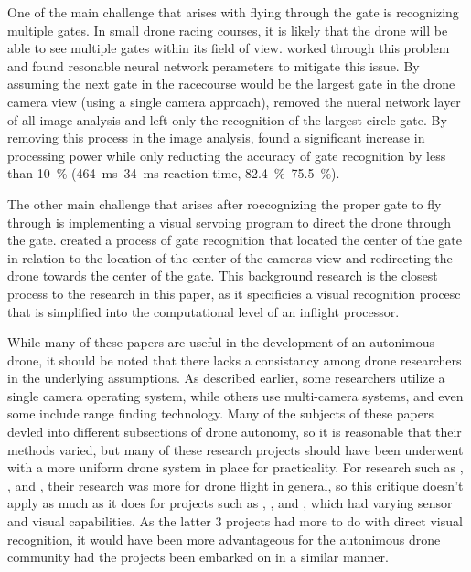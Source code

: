 \documentclass[onecolumn,10pt]{IEEEtran}
\begin{document}
One of the main challenge that arises with flying through the gate is recognizing multiple gates. In small drone racing courses, it is likely that the drone will be able to see multiple gates within its field of view. \cite{jung2018perception} worked through this problem and found resonable neural network perameters to mitigate this issue. By assuming the next gate in the racecourse would be the largest gate in the drone camera view (using a single camera approach), \cite{jung2018perception} removed the nueral network layer of all image analysis and left only the recognition of the largest circle gate. By removing this process in the image analysis, \cite{jung2018perception} found a significant increase in processing power while only reducting the accuracy of gate recognition by less than \SI{10}{\percent} (\SIrange{464}{34}{\milli\second} reaction time, \SIrange{82.4}{75.5}{\percent}).

The other main challenge that arises after roecognizing the proper gate to fly through is implementing a visual servoing program to direct the drone through the gate. \cite{jung2018direct} created a process of gate recognition that located the center of the gate in relation to the location of the center of the cameras view and redirecting the drone towards the center of the gate. This background research is the closest process to the research in this paper, as it specificies a visual recognition procesc that is simplified into the computational level of an inflight processor.

While many of these papers are useful in the development of an autonimous drone, it should be noted that there lacks a consistancy among drone researchers in the underlying assumptions. As described earlier, some researchers utilize a single camera operating system, while others use multi-camera systems, and even some include range finding technology. Many of the subjects of these papers devled into different subsections of drone autonomy, so it is reasonable that their methods varied, but many of these research projects should have been underwent with a more uniform drone system in place for practicality. For research such as \cite{svacha2017improving}, \cite{loianno2017estimation}, and \cite{florence2018nanomap}, their research was more for drone flight in general, so this critique doesn’t apply as much as it does for projects such as \cite{zhilenkov2018use}, \cite{jung2018perception}, and \cite{jung2018direct}, which had varying sensor and visual capabilities. As the latter 3 projects had more to do with direct visual recognition, it would have been more advantageous for the autonimous drone community had the projects been embarked on in a similar manner.
\end{document}
